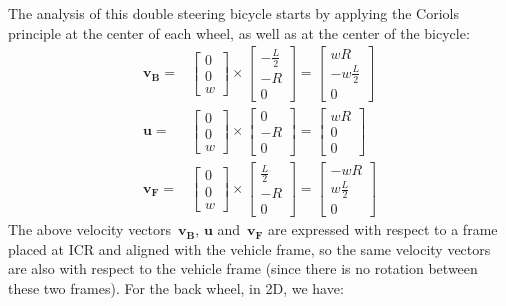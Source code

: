 The analysis of this double steering bicycle starts by applying the Coriols principle at the center of each wheel, as well as at the center of the bicycle:
\begin{align}
\mathbf{v_B} = & 
\left[
 \begin{array}{c}
  0  \\
  0  \\
  w 
 \end{array}
\right]
\times 
\left[
 \begin{array}{c}
  -\frac{L}{2}  \\
  -R  \\
  0 
 \end{array}
\right]
= 
\left[
 \begin{array}{c}
  wR  \\
  -w\frac{L}{2}  \\
  0 
 \end{array}
\right] \\
\mathbf{u} = & 
\left[
 \begin{array}{c}
  0  \\
  0  \\
  w 
 \end{array}
\right]
\times 
\left[
 \begin{array}{c}
  0  \\
  -R  \\
  0 
 \end{array}
\right]
= 
\left[
 \begin{array}{c}
  wR  \\
  0  \\
  0 
 \end{array}
\right] \\
\mathbf{v_F} = & 
\left[
 \begin{array}{c}
  0  \\
  0  \\
  w 
 \end{array}
\right]
\times 
\left[
 \begin{array}{c}
  \frac{L}{2}  \\
  -R  \\
  0 
 \end{array}
\right]
= 
\left[
 \begin{array}{c}
  -wR  \\
  w\frac{L}{2}  \\
  0 
 \end{array}
\right]
\end{align} 
The above velocity vectors~$\mathbf{v_B}$, $\mathbf{u}$ and~$\mathbf{v_F}$ are expressed with respect to a frame placed at ICR and aligned with the vehicle frame, so the same velocity vectors are also with respect to the vehicle frame (since there is no rotation between these two frames). For the back wheel, in 2D, we have: 
